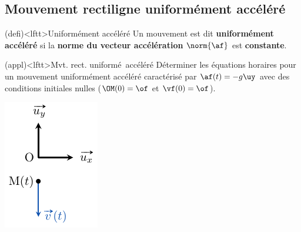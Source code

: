 \documentclass[../../main/main.tex]{subfiles}
\begin{document}
\subsection{Mouvement rectiligne uniformément accéléré}
\begin{tcb}(defi)<lftt>{Uniformément accéléré}
	Un mouvement est dit \textbf{uniformément accéléré} si la \textbf{norme du
		vecteur accélération} $\norm{\af}$ est \textbf{constante}.
\end{tcb}

\begin{tcb*}(appl)<lftt>{Mvt. rect. uniformé\mnt\ accéléré}
	Déterminer les équations horaires pour un mouvement uniformément accéléré
	caractérisé par $\af(t) = -g \uy$ avec des conditions initiales nulles
	($\OM(0) = \of$ et $\vf(0) = \of$).
	\tcblower
	\begin{isd}[righthand ratio=.15]
		\vspace{-15pt}
		\tcblower
		\begin{center}
			\includegraphics[width=\linewidth]{nov_init}

\end{center}
\end{isd}
\end{tcb*}
\end{document}
